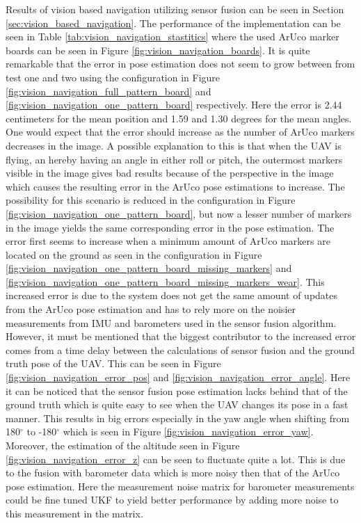 \documentclass[../Head/report.tex]{subfiles}
\begin{document}
Results of vision based navigation utilizing sensor fusion can be seen in Section \ref{sec:vision_based_navigation}. The performance of the implementation can be seen in Table \ref{tab:vision_navigation_stastitics} where the used ArUco marker boards can be seen in Figure \ref{fig:vision_navigation_boards}. It is quite remarkable that the error in pose estimation does not seem to grow between from test one and two using the configuration in Figure \ref{fig:vision_navigation_full_pattern_board} and \ref{fig:vision_navigation_one_pattern_board} respectively. Here the error is 2.44 centimeters for the mean position and 1.59 and 1.30 degrees for the mean angles. One would expect that the error should increase as the number of ArUco markers decreases in the image. A possible explanation to this is that when the UAV is flying, an hereby having an angle in either roll or pitch, the outermost markers visible in the image gives bad results because of the perspective in the image which causes the resulting error in the ArUco pose estimations to increase. The possibility for this scenario is reduced in the configuration in Figure \ref{fig:vision_navigation_one_pattern_board}, but now a lesser number of markers in the image yields the same corresponding error in the pose estimation. The error first seems to increase when a minimum amount of ArUco markers are located on the ground as seen in the configuration in Figure \ref{fig:vision_navigation_one_pattern_board_missing_markers} and \ref{fig:vision_navigation_one_pattern_board_missing_markers_wear}. This increased error is due to the system does not get the same amount of updates from the ArUco pose estimation and has to rely more on the noisier measurements from IMU and barometers used in the sensor fusion algorithm. However, it must be mentioned that the biggest contributor to the increased error comes from a time delay between the calculations of sensor fusion and the ground truth pose of the UAV. This can be seen in Figure \ref{fig:vision_navigation_error_pos} and \ref{fig:vision_navigation_error_angle}. Here it can be noticed that the sensor fusion pose estimation lacks behind that of the ground truth which is quite easy to see when the UAV changes its pose in a fast manner. This results in big errors especially in the yaw angle when shifting from 180$^{\circ}$ to -180$^{\circ}$ which is seen in Figure \ref{fig:vision_navigation_error_yaw}. Moreover, the estimation of the altitude seen in Figure \ref{fig:vision_navigation_error_z} can be seen to fluctuate quite a lot. This is due to the fusion with barometer data which is more noisy then that of the ArUco pose estimation. Here the measurement noise matrix for barometer measurements could be fine tuned UKF to yield better performance by adding more noise to this measurement in the matrix. 
\end{document}
